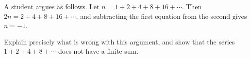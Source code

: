 A student argues as follows. Let $n=1+2+4+8+16+\cdots$. Then $2n=2+4+8+16+\cdots$, and subtracting the first equation from the second gives $n=-1$.

Explain precisely what is wrong with this argument, and show that the series $1+2+4+8+\cdots$ does not have a finite sum.
